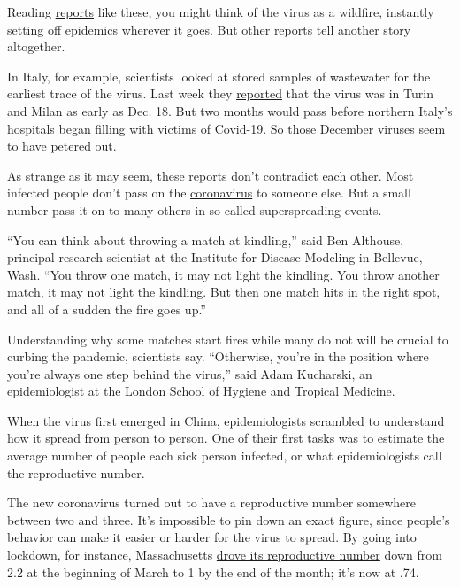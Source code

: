 Reading
\href{https://www.nytimes3xbfgragh.onion/2020/06/22/us/new-coronavirus-phase.html?action=click\&module=Top\%20Stories\&pgtype=Homepage}{reports}
like these, you might think of the virus as a wildfire, instantly
setting off epidemics wherever it goes. But other reports tell another
story altogether.

In Italy, for example, scientists looked at stored samples of wastewater
for the earliest trace of the virus. Last week they
\href{https://www.thelocal.it/20200619/coronavirus-was-already-in-italy-by-december-waste-water-study-shows}{reported}
that the virus was in Turin and Milan as early as Dec. 18. But two
months would pass before northern Italy's hospitals began filling with
victims of Covid-19. So those December viruses seem to have petered out.

As strange as it may seem, these reports don't contradict each other.
Most infected people don't pass on the
\href{https://www.nytimes3xbfgragh.onion/2020/07/04/health/239-experts-with-one-big-claim-the-coronavirus-is-airborne.html}{coronavirus}
to someone else. But a small number pass it on to many others in
so-called superspreading events.

``You can think about throwing a match at kindling,'' said Ben Althouse,
principal research scientist at the Institute for Disease Modeling in
Bellevue, Wash. ``You throw one match, it may not light the kindling.
You throw another match, it may not light the kindling. But then one
match hits in the right spot, and all of a sudden the fire goes up.''

Understanding why some matches start fires while many do not will be
crucial to curbing the pandemic, scientists say. ``Otherwise, you're in
the position where you're always one step behind the virus,'' said Adam
Kucharski, an epidemiologist at the London School of Hygiene and
Tropical Medicine.

When the virus first emerged in China, epidemiologists scrambled to
understand how it spread from person to person. One of their first tasks
was to estimate the average number of people each sick person infected,
or what epidemiologists call the reproductive number.

The new coronavirus turned out to have a reproductive number somewhere
between two and three. It's impossible to pin down an exact figure,
since people's behavior can make it easier or harder for the virus to
spread. By going into lockdown, for instance, Massachusetts
\href{https://rt.live/us/MA}{drove its reproductive number} down from
2.2 at the beginning of March to 1 by the end of the month; it's now at
.74.

